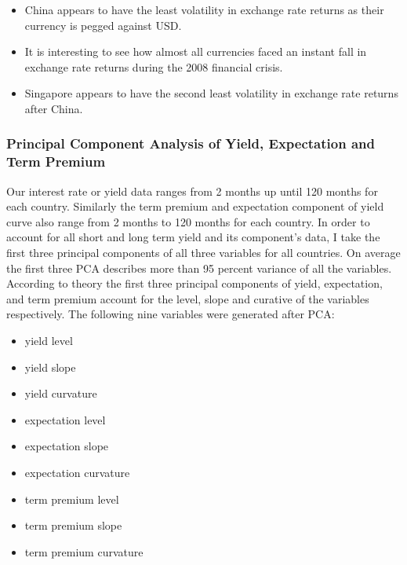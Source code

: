 \documentclass{article}
\begin{document}
\begin{itemize}
  \item China appears to have the least volatility in exchange rate returns as their currency is pegged against USD.
  \item It is interesting to see how almost all currencies faced an instant fall in exchange rate returns during the 2008 financial crisis.
  \item Singapore appears to have the second least volatility in exchange rate returns after China.
\end{itemize}

\newpage

\subsubsection{Principal Component Analysis of Yield, Expectation and Term Premium}

\vspace*{5mm}

Our interest rate or yield data ranges from 2 months up until 120 months for each country. Similarly the term premium
and expectation component of yield curve also range from 2 months to 120 months for each country. In order to account for
all short and long term yield and its component's data, I take the first three principal components of all three variables for all countries.
On average the first three PCA describes more than 95 percent variance of all the variables. According to theory the first three principal components
of yield, expectation, and term premium account for the level, slope and curative of the variables respectively. The following nine variables were generated
after PCA:

\vspace*{5mm}
\begin{itemize}
  \item yield level
  \item yield slope
  \item yield curvature
  \item expectation level
  \item expectation slope
  \item expectation curvature
  \item term premium level
  \item term premium slope
  \item term premium curvature
\end{itemize}
\end{document}
